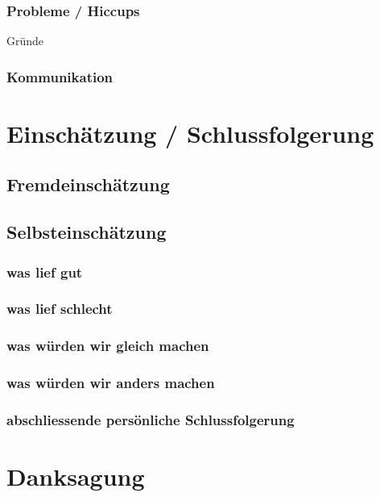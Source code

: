 \documentclass[a4paper,11pt]{article}
\begin{document}
\subsubsection{Probleme / Hiccups}
Gründe

\subsubsection{Kommunikation}

\section{Einschätzung / Schlussfolgerung}

\subsection{Fremdeinschätzung}
\subsection{Selbsteinschätzung}
\subsubsection{was lief gut}
\subsubsection{was lief schlecht}
\subsubsection{was würden wir gleich machen}
\subsubsection{was würden wir anders machen}
\subsubsection{abschliessende persönliche Schlussfolgerung}

\section{Danksagung}
\end{document}
